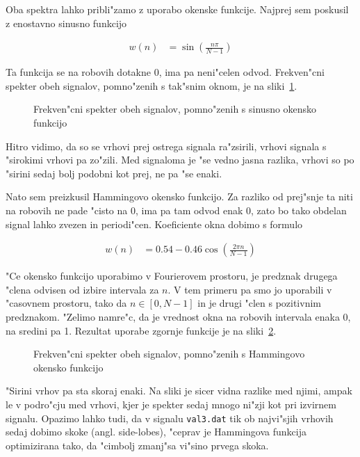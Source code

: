 \documentclass[a4paper,10pt]{article}
\begin{document}
Oba spektra lahko pribli"zamo z uporabo okenske funkcije. Najprej sem poskusil z enostavno sinusno funkcijo

\begin{align}
 w(n) &= \sin(\frac{n\pi}{N-1})
\end{align}

Ta funkcija se na robovih dotakne 0, ima pa neni"celen odvod. Frekven"cni spekter obeh signalov, pomno"zenih s tak"snim oknom, je na sliki~\ref{fig:val-cos}. 

\begin{figure}[h]
 
\caption{Frekven"cni spekter obeh signalov, pomno"zenih s sinusno okensko funkcijo}
\label{fig:val-cos}
\end{figure}

Hitro vidimo, da so se vrhovi prej ostrega signala ra"zsirili, vrhovi signala s "sirokimi vrhovi pa zo"zili. Med signaloma je "se vedno jasna razlika, vrhovi so po "sirini sedaj bolj podobni kot prej, ne pa "se enaki. 

Nato sem preizkusil Hammingovo okensko funkcijo. Za razliko od prej"snje ta niti na robovih ne pade "cisto na 0, ima pa tam odvod enak 0, zato bo tako obdelan signal lahko zvezen in periodi"cen. Koeficiente okna dobimo s formulo

\begin{align}
 w(n) &= 0.54 - 0.46 \cos \left(\frac{2\pi n}{N-1}\right)
\end{align}

"Ce okensko funkcijo uporabimo v Fourierovem prostoru, je predznak drugega "clena odvisen od izbire intervala za $n$. V tem primeru pa smo jo uporabili v "casovnem prostoru, tako da $n \in [0,N-1]$ in je drugi "clen s pozitivnim predznakom. "Zelimo namre"c, da je vrednost okna na robovih intervala enaka 0, na sredini pa 1.  Rezultat uporabe zgornje funkcije je na sliki~\ref{fig:val-hamm}. 

\begin{figure}[h]
 
\caption{Frekven"cni spekter obeh signalov, pomno"zenih s Hammingovo okensko funkcijo}
\label{fig:val-hamm}
\end{figure}

"Sirini vrhov pa sta skoraj enaki. Na sliki je sicer vidna razlike med njimi, ampak le v podro"cju med vrhovi, kjer je spekter sedaj mnogo ni"zji kot pri izvirnem signalu. Opazimo lahko tudi, da v signalu \texttt{val3.dat} tik ob najvi"sjih vrhovih sedaj dobimo skoke (angl. side-lobes), "ceprav je Hammingova funkcija optimizirana tako, da "cimbolj zmanj"sa vi"sino prvega skoka. 
\end{document}

